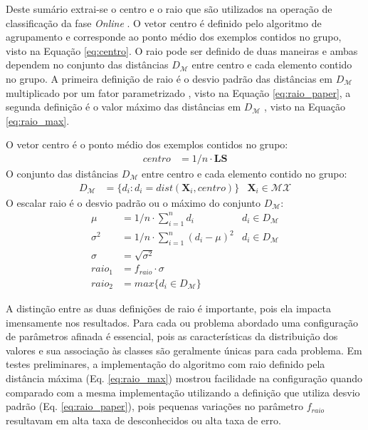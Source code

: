 
Deste sumário extrai-se o centro e o raio que são utilizados na operação de
classificação da fase \emph{Online} \cite{Faria2016minas}.
O vetor centro é definido pelo algoritmo de agrupamento e corresponde ao
ponto médio dos exemplos contidos no grupo, visto na Equação \ref{eq:centro}.
O raio pode ser definido de duas maneiras e ambas dependem no conjunto das
distâncias $D_\mathcal{M}$ entre centro e cada elemento contido no grupo.
A primeira definição de raio é o desvio padrão das distâncias em $D_\mathcal{M}$
multiplicado por um fator parametrizado \cite{Faria2016minas}, visto na Equação
\ref{eq:raio_paper}, a segunda definição é o valor máximo das distâncias em
$D_\mathcal{M}$ \cite{Faria2013source}, visto na Equação \ref{eq:raio_max}.

\begin{definition}
  O vetor centro é o ponto médio dos exemplos contidos no grupo:
  \begin{align}
    centro    &= 1/n \cdot \mathbf{LS} \label{eq:centro}
  \end{align}
  O conjunto das distâncias $D_\mathcal{M}$ entre centro e cada elemento contido no grupo:
  \begin{align}
    D_\mathcal{M}  &= \{ d_i : d_i = dist(\mathbf{X}_i, centro) \} & \mathbf{X}_i \in \mathcal{MX} \nonumber
  \end{align}
  O escalar raio é o desvio padrão ou o máximo do conjunto $D_\mathcal{M}$:
  \begin{align}
    \mu       &= 1/n \cdot \sum_{i=1}^{n} d_i             & d_i \in D_\mathcal{M} \nonumber \\
    \sigma^2  &= 1/n \cdot \sum_{i=1}^{n} (d_i - \mu) ^2  & d_i \in D_\mathcal{M} \nonumber \\
    \sigma    &= \sqrt{ \sigma^2 }                        & \nonumber \\
    raio_1    &= f_{raio} \cdot \sigma                    & \label{eq:raio_paper}\\
    raio_2    &= max\{ d_i \in D_\mathcal{M} \}           & \label{eq:raio_max}
  \end{align}
\end{definition}


A distinção entre as duas definições de raio é importante, pois ela impacta
imensamente nos resultados.
Para cada \dataset ou problema abordado uma configuração de parâmetros afinada
é essencial, pois as características da distribuição dos valores e sua associação
às classes são geralmente únicas para cada problema.
Em testes preliminares, a implementação do algoritmo \minas com raio definido
pela distância máxima (Eq. \ref{eq:raio_max}) mostrou facilidade na configuração quando
comparado com a mesma implementação utilizando a definição que utiliza desvio
padrão (Eq. \ref{eq:raio_paper}), pois pequenas variações no parâmetro $f_{raio}$
resultavam em alta taxa de desconhecidos ou alta taxa de erro.


